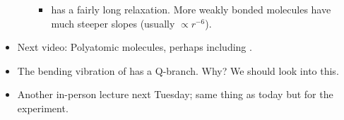\documentclass[../notes.tex]{subfiles}
\begin{document}
\begin{itemize}
\begin{itemize}
\begin{itemize}
            \item {} has a fairly long relaxation. More weakly bonded molecules have much steeper slopes (usually $\propto r^{-6}$).
        \end{itemize}
    \end{itemize}
    \item Next video: Polyatomic molecules, perhaps including .
    \item The bending vibration of  has a Q-branch. Why? We should look into this.
    \item Another in-person lecture next Tuesday; same thing as today but for the  experiment.
\end{itemize}
\end{document}
